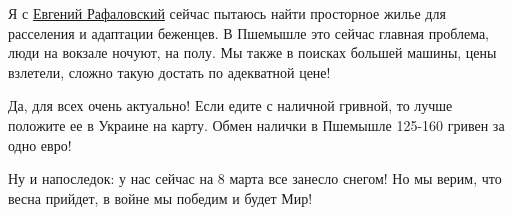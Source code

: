 Я с \href{https://www.facebook.com/evgen.rafalovsky}{Евгений Рафаловский}
сейчас пытаюсь найти просторное жилье для расселения и адаптации беженцев. В
Пшемышле это сейчас главная проблема, люди на вокзале ночуют, на полу. Мы также
в поисках большей машины, цены взлетели, сложно такую достать по адекватной
цене!

Да, для всех очень актуально! Если едите с наличной гривной, то лучше положите
ее в Украине на карту. Обмен налички в Пшемышле 125-160 гривен за одно евро!

Ну и напоследок: у нас сейчас на 8 марта все занесло  снегом! Но мы верим, что
весна прийдет, в войне мы победим и будет Мир!
